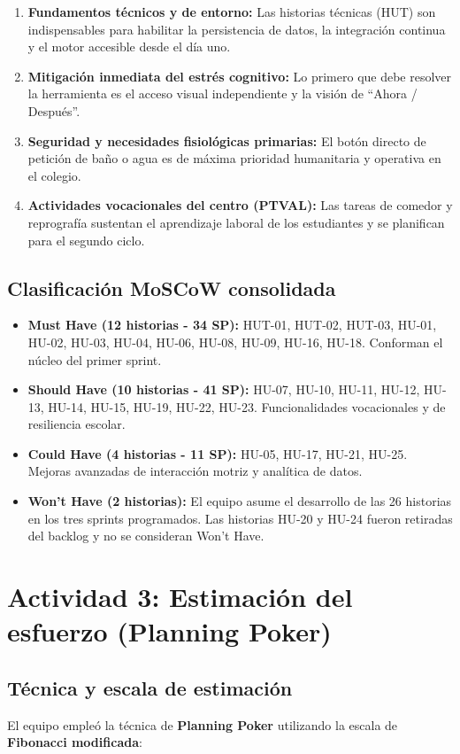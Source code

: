 \documentclass[11pt,a4paper]{article}
\newcommand{\hl}[1]{\textcolor{gblue}{\textbf{#1}}}
\begin{document}
\begin{enumerate}[leftmargin=1.6em,itemsep=2pt]
\item \textbf{Fundamentos técnicos y de entorno:} Las historias técnicas (HUT) son indispensables para habilitar la persistencia de datos, la integración continua y el motor accesible desde el día uno.
\item \textbf{Mitigación inmediata del estrés cognitivo:} Lo primero que debe resolver la herramienta es el acceso visual independiente y la visión de ``Ahora / Después''.
\item \textbf{Seguridad y necesidades fisiológicas primarias:} El botón directo de petición de baño o agua es de máxima prioridad humanitaria y operativa en el colegio.
\item \textbf{Actividades vocacionales del centro (PTVAL):} Las tareas de comedor y reprografía sustentan el aprendizaje laboral de los estudiantes y se planifican para el segundo ciclo.
\end{enumerate}

\subsection{Clasificación MoSCoW consolidada}
\begin{itemize}
\item \textbf{Must Have (12 historias - 34 SP):} HUT-01, HUT-02, HUT-03, HU-01, HU-02, HU-03, HU-04, HU-06, HU-08, HU-09, HU-16, HU-18. Conforman el núcleo del primer sprint.
\item \textbf{Should Have (10 historias - 41 SP):} HU-07, HU-10, HU-11, HU-12, HU-13, HU-14, HU-15, HU-19, HU-22, HU-23. Funcionalidades vocacionales y de resiliencia escolar.
\item \textbf{Could Have (4 historias - 11 SP):} HU-05, HU-17, HU-21, HU-25. Mejoras avanzadas de interacción motriz y analítica de datos.
\item \textbf{Won't Have (2 historias):} El equipo asume el desarrollo de las 26 historias en los tres sprints programados. Las historias HU-20 y HU-24 fueron retiradas del backlog y no se consideran Won't Have.
\end{itemize}

\section{Actividad 3: Estimación del esfuerzo (Planning Poker)}
\subsection{Técnica y escala de estimación}
El equipo empleó la técnica de \hl{Planning Poker} utilizando la escala de \textbf{Fibonacci modificada}:
\end{document}
